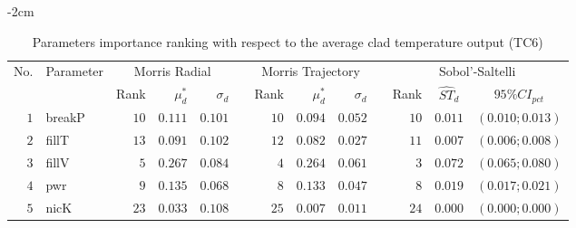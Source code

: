\begin{table*}[!htbp]\centering
{}
\begin{adjustwidth*}{}{-2cm}
\caption{Parameters importance ranking with respect to the average clad temperature output (TC$6$)}
\label{tab:app_screening_tc6_average}
\begin{tabular}{@{}rlrrrrrrrrrcc@{}}\toprule
\multirow{2}{*}{\footnotesize{No.}} & \multirow{2}{*}{\footnotesize{Parameter}} & \multicolumn{3}{c}{\footnotesize{Morris Radial}} & \phantom{a} & \multicolumn{3}{c}{\footnotesize{Morris Trajectory}}  &\phantom{a}& \multicolumn{3}{c}{\footnotesize{Sobol'-Saltelli}}                               \\             
                                                                                  \cmidrule{3-5}                                                   \cmidrule{7-9}                                                      \cmidrule{11-13}
                                    &                                           & \footnotesize{Rank}   & $\mu^*_d$ & $\sigma_d$   &             & \footnotesize{Rank} & $\mu^*_d$ & $\sigma_d$          &           & \footnotesize{Rank} & \footnotesize{$\hat{ST}_d$} & \footnotesize{$95\%CI_{pct}$}\\ \midrule
\footnotesize{$1 $} & \footnotesize{breakP   } & \footnotesize{$10$} & \footnotesize{$0.111$} & \footnotesize{$0.101$} && \footnotesize{$10$} & \footnotesize{$0.094$} & \footnotesize{$0.052$} && \footnotesize{$10$} & \footnotesize{$0.011$} & \footnotesize{$(0.010;0.013)$} \\
\footnotesize{$2 $} & \footnotesize{fillT    } & \footnotesize{$13$} & \footnotesize{$0.091$} & \footnotesize{$0.102$} && \footnotesize{$12$} & \footnotesize{$0.082$} & \footnotesize{$0.027$} && \footnotesize{$11$} & \footnotesize{$0.007$} & \footnotesize{$(0.006;0.008)$} \\
\footnotesize{$3 $} & \footnotesize{fillV    } & \footnotesize{$5 $} & \footnotesize{$0.267$} & \footnotesize{$0.084$} && \footnotesize{$4 $} & \footnotesize{$0.264$} & \footnotesize{$0.061$} && \footnotesize{$3 $} & \footnotesize{$0.072$} & \footnotesize{$(0.065;0.080)$} \\
\footnotesize{$4 $} & \footnotesize{pwr      } & \footnotesize{$9 $} & \footnotesize{$0.135$} & \footnotesize{$0.068$} && \footnotesize{$8 $} & \footnotesize{$0.133$} & \footnotesize{$0.047$} && \footnotesize{$8 $} & \footnotesize{$0.019$} & \footnotesize{$(0.017;0.021)$} \\
\footnotesize{$5 $} & \footnotesize{nicK     } & \footnotesize{$23$} & \footnotesize{$0.033$} & \footnotesize{$0.108$} && \footnotesize{$25$} & \footnotesize{$0.007$} & \footnotesize{$0.011$} && \footnotesize{$24$} & \footnotesize{$0.000$} & \footnotesize{$(0.000;0.000)$} \\

\end{tabular}
\end{adjustwidth*}
\end{table*}
